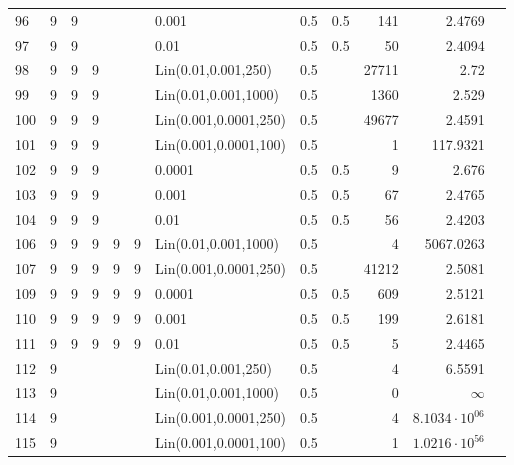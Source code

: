 \begin{longtable}{lrrrrrlrrrrr}
   96 &       9 & 9 &   &   &   &                 0.001 &  0.5 &    0.5 &     141 &                 2.4769 \\
   97 &       9 & 9 &   &   &   &                  0.01 &  0.5 &    0.5 &      50 &                 2.4094 \\
   98 &       9 & 9 & 9 &   &   &   Lin(0.01,0.001,250) &  0.5 &        &   27711 &                   2.72 \\
   99 &       9 & 9 & 9 &   &   &  Lin(0.01,0.001,1000) &  0.5 &        &    1360 &                  2.529 \\
  100 &       9 & 9 & 9 &   &   & Lin(0.001,0.0001,250) &  0.5 &        &   49677 &                 2.4591 \\
  101 &       9 & 9 & 9 &   &   & Lin(0.001,0.0001,100) &  0.5 &        &       1 &               117.9321 \\
  102 &       9 & 9 & 9 &   &   &                0.0001 &  0.5 &    0.5 &       9 &                  2.676 \\
  103 &       9 & 9 & 9 &   &   &                 0.001 &  0.5 &    0.5 &      67 &                 2.4765 \\
  104 &       9 & 9 & 9 &   &   &                  0.01 &  0.5 &    0.5 &      56 &                 2.4203 \\
  106 &       9 & 9 & 9 & 9 & 9 &  Lin(0.01,0.001,1000) &  0.5 &        &       4 &              5067.0263 \\
  107 &       9 & 9 & 9 & 9 & 9 & Lin(0.001,0.0001,250) &  0.5 &        &   41212 &                 2.5081 \\
  109 &       9 & 9 & 9 & 9 & 9 &                0.0001 &  0.5 &    0.5 &     609 &                 2.5121 \\
  110 &       9 & 9 & 9 & 9 & 9 &                 0.001 &  0.5 &    0.5 &     199 &                 2.6181 \\
  111 &       9 & 9 & 9 & 9 & 9 &                  0.01 &  0.5 &    0.5 &       5 &                 2.4465 \\
  112 &       9 &   &   &   &   &   Lin(0.01,0.001,250) &  0.5 &        &       4 &                 6.5591 \\
  113 &       9 &   &   &   &   &  Lin(0.01,0.001,1000) &  0.5 &        &       0 &               $\infty$ \\
  114 &       9 &   &   &   &   & Lin(0.001,0.0001,250) &  0.5 &        &       4 &  $8.1034\cdot 10^{06}$ \\
  115 &       9 &   &   &   &   & Lin(0.001,0.0001,100) &  0.5 &        &       1 &  $1.0216\cdot 10^{56}$ \\

\end{longtable}
